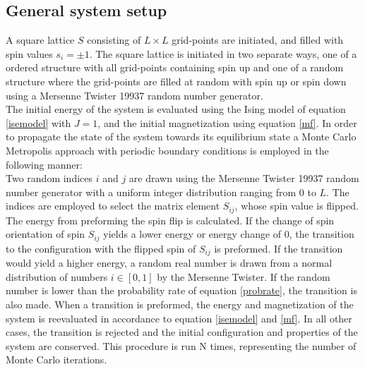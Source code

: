 \documentclass[%
reprint,nofootinbib,
amsmath,amssymb,
aps,
]{revtex4-1}
\begin{document}
\subsection*{General system setup} \noindent 
A square lattice $S$ consisting of $L\times L$ grid-points are initiated, and filled with spin values $s_i = \pm 1$.  The square lattice is initiated in two separate ways, one of a ordered structure with all grid-points containing spin up and one of a random structure where the grid-points are filled at random with spin up or spin down using a Mersenne Twister 19937 random number generator. \\ 
\indent The initial energy of the system is evaluated using the Ising model of equation \ref{isemodel} with $J = 1$, and the initial magnetization using equation \ref{mf}. In order to propagate the state of the system towards its equilibrium state a Monte Carlo Metropolis approach with periodic boundary conditions is employed in the following manner: \\ 
\indent Two random indices $i$ and $j$ are drawn using the Mersenne Twister 19937 random number generator with a uniform integer distribution ranging from 0 to $L$. The indices are employed to select the matrix element $S_{ij}$, whose spin value is flipped. The energy from preforming the spin flip is calculated. If the change of spin orientation of spin $S_{ij}$ yields a lower energy or energy change of 0, the transition to the configuration with the flipped spin of $S_{ij}$ is preformed. If the transition would yield a higher energy, a random real number is drawn from a normal distribution of numbers $i\in[0,1]$ by the Mersenne Twister. If the random number is lower than the probability rate of equation \ref{probrate}, the transition is also made. When a transition is preformed, the energy and magnetization of the system is reevaluated in accordance to equation \ref{isemodel} and \ref{mf}. In all other cases, the transition is rejected and the initial configuration and properties of the system are conserved. This procedure is run N times, representing the number of Monte Carlo iterations.\\ \indent
\end{document}
